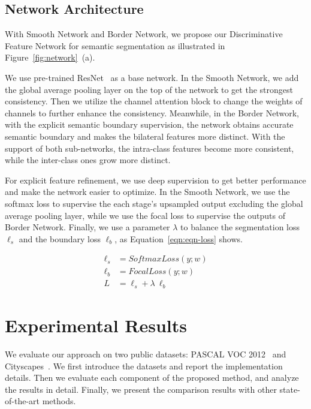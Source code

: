 \documentclass[10pt,twocolumn,letterpaper]{article}
\begin{document}
\subsection{Network Architecture}
With Smooth Network and Border Network, we propose our Discriminative Feature Network for semantic segmentation as illustrated in Figure~\ref{fig:network}~(a).

We use pre-trained ResNet~\cite{He-CVPR-ResNet-2016} as a base network. In the Smooth Network, we add the global average pooling layer on the top of the network to get the strongest consistency. Then we utilize the channel attention block to change the weights of channels to further enhance the consistency. Meanwhile, in the Border Network, with the explicit semantic boundary supervision, the network obtains accurate semantic boundary and makes the bilateral features more distinct. With the support of both sub-networks, the intra-class features become more consistent, while the inter-class ones grow more distinct. 

For explicit feature refinement, we use deep supervision to get better performance and make the network easier to optimize. In the Smooth Network, we use the softmax loss to supervise the each stage's upsampled output excluding the global average pooling layer, while we use the focal loss to supervise the outputs of Border Network. Finally, we use a parameter $\lambda$ to balance the segmentation loss $\ell_{s}$ and the boundary loss $\ell_{b}$, as Equation~\ref{eqn:eqn-loss} shows.

\begin{align}
\ell_{s} &= SoftmaxLoss(y;w) \\
\ell_{b} &= FocalLoss(y;w) \\
L &= \ell_{s}+\lambda \ \ell_{b}
\label{eqn:eqn-loss}
\end{align}


\section{Experimental Results}
\label{sec:experiments}
We evaluate our approach on two public datasets: PASCAL VOC 2012~\cite{Pascal-VOC-2012} and Cityscapes~\cite{Cityscapes}. We first introduce the datasets and report the implementation details. Then we evaluate each component of the proposed method, and analyze the results in detail. Finally, we present the comparison results with other state-of-the-art methods.
\end{document}
